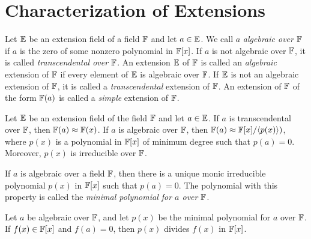 \section{Characterization of Extensions}

\begin{definition}
	Let $\mathbb{E}$ be an extension field of a field $\mathbb{F}$ and let $a \in \mathbb{E}$. We call $a$ \textit{algebraic over $\mathbb{F}$} if $a$ is the zero of some nonzero polynomial in $\mathbb{F}[x]$. If $a$ is not algebraic over $\mathbb{F}$, it is called \textit{transcendental over $\mathbb{F}$}. An extension $\mathbb{E}$ of $\mathbb{F}$ is called an \textit{algebraic} extension of $\mathbb{F}$ if every element of $\mathbb{E}$ is algebraic over $\mathbb{F}$. If $\mathbb{E}$ is not an algebraic extension of $\mathbb{F}$, it is called a \textit{transcendental} extension of $\mathbb{F}$. An extension of $\mathbb{F}$ of the form $\mathbb{F}(a)$ is called a \textit{simple} extension of $\mathbb{F}$.
\end{definition}

\begin{theorem}
	Let $\mathbb{E}$ be an extension field of the field $\mathbb{F}$ and let $a \in \mathbb{E}$. If $a$ is transcendental over $\mathbb{F}$, then $\mathbb{F}(a) \approx \mathbb{F}(x)$. If $a$ is algebraic over $\mathbb{F}$, then $\mathbb{F}(a) \approx \mathbb{F}[x]/\langle p(x) \rangle)$, where $p(x)$ is a polynomial in $\mathbb{F}[x]$ of minimum degree such that $p(a) = 0$. Moreover, $p(x)$ is irreducible over $\mathbb{F}$.
\end{theorem}

\begin{theorem}
	If $a$ is algebraic over a field $\mathbb{F}$, then there is a unique monic irreducible polynomial $p(x)$ in $\mathbb{F}[x]$ such that $p(a)=0$. The polynomial with this property is called the \textit{minimal polynomial for $a$ over $\mathbb{F}$}.
\end{theorem}

\begin{theorem}
	Let $a$ be algebraic over $\mathbb{F}$, and let $p(x)$ be the minimal polynomial for $a$ over $\mathbb{F}$. If $f(x) \in \mathbb{F}[x]$ and $f(a) = 0$, then $p(x)$ divides $f(x)$ in $\mathbb{F}[x]$.
\end{theorem}
